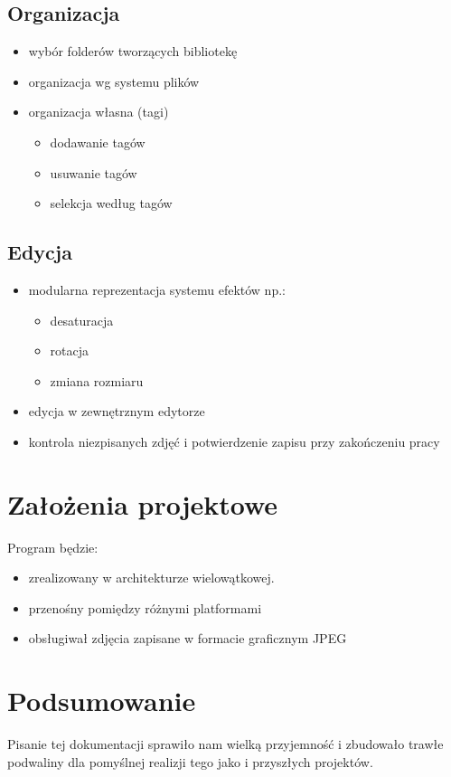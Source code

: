 \documentclass[11pt,a4paper]{article}
\begin{document}
\subsection{Organizacja}
\begin{itemize}
  \item wybór folderów tworzących bibliotekę
  \item organizacja wg systemu plików
  \item organizacja własna (tagi)
  \begin{itemize}
    \item dodawanie tagów 
    \item usuwanie tagów
    \item selekcja według tagów
  \end{itemize}
\end{itemize}

\subsection{Edycja}
\begin{itemize}
  \item modularna reprezentacja systemu efektów np.:
      \begin{itemize}
        \item desaturacja
        \item rotacja
        \item zmiana rozmiaru
      \end{itemize}
  \item edycja w zewnętrznym edytorze
  \item kontrola niezpisanych zdjęć i potwierdzenie zapisu przy zakończeniu pracy
\end{itemize}

\section{Założenia projektowe}
Program będzie:
\begin{itemize}
  \item zrealizowany w architekturze wielowątkowej.
  \item przenośny pomiędzy różnymi platformami 
  \item obsługiwał zdjęcia zapisane w formacie graficznym JPEG
\end{itemize}

\section{Podsumowanie}
Pisanie tej dokumentacji sprawiło nam wielką przyjemność i zbudowało trawłe podwaliny dla pomyślnej realizji tego jako i przyszłych projektów.
\end{document}
